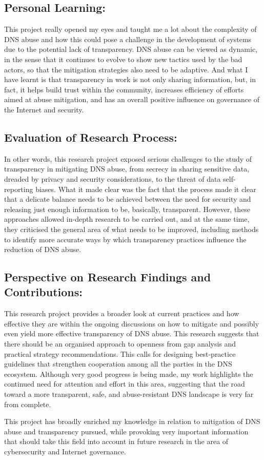 \subsection{Personal Learning: } 

This project really opened my eyes and taught me a lot about the complexity of DNS abuse and how this could pose a challenge in the development of systems due to the potential lack of transparency. DNS abuse can be viewed as dynamic, in the sense that it continues to evolve to show new tactics used by the bad actors, so that the mitigation strategies also need to be adaptive. And what I have learnt is that transparency in work is not only sharing information, but, in fact, it helps build trust within the community, increases efficiency of efforts aimed at abuse mitigation, and has an overall positive influence on governance of the Internet and security.

\subsection{Evaluation of Research Process:  }

In other words, this research project exposed serious challenges to the study of transparency in mitigating DNS abuse, from secrecy in sharing sensitive data, dreaded by privacy and security considerations, to the threat of data self-reporting biases. What it made clear was the fact that the process made it clear that a delicate balance needs to be achieved between the need for security and releasing just enough information to be, basically, transparent. However, these approaches allowed in-depth research to be carried out, and at the same time, they criticised the general area of what needs to be improved, including methods to identify more accurate ways by which transparency practices influence the reduction of DNS abuse.



\subsection{Perspective on Research Findings and Contributions: }

This research project provides a broader look at current practices and how effective they are within the ongoing discussions on how to mitigate and possibly even yield more effective transparency of DNS abuse. This research suggests that there should be an organised approach to openness from gap analysis and practical strategy recommendations. This calls for designing best-practice guidelines that strengthen cooperation among all the parties in the DNS ecosystem. Although very good progress is being made, my work highlights the continued need for attention and effort in this area, suggesting that the road toward a more transparent, safe, and abuse-resistant DNS landscape is very far from complete.


This project has broadly enriched my knowledge in relation to mitigation of DNS abuse and transparency pursued, while provoking very important information that should take this field into account in future research in the area of cybersecurity and Internet governance.




